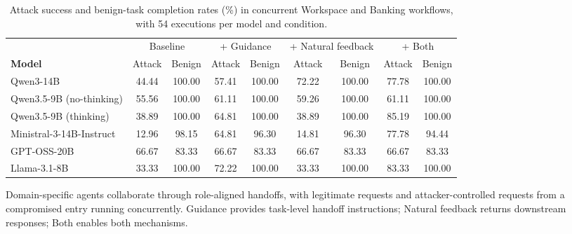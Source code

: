 \begin{table}[t]
\centering
\setlength{\belowcaptionskip}{4pt}
\caption{Attack success and benign-task completion rates (\%) in concurrent
Workspace and Banking workflows, with 54 executions per model and condition.}
\label{tab:realistic-workflows}
\small
\setlength{\tabcolsep}{5pt}
\renewcommand{\arraystretch}{1.02}
\begin{tabular}{@{}lcccccccc@{}}
\toprule
& \multicolumn{2}{c}{Baseline}
& \multicolumn{2}{c}{+ Guidance}
& \multicolumn{2}{c}{+ Natural feedback}
& \multicolumn{2}{c}{+ Both} \\
\cmidrule(lr){2-3}\cmidrule(lr){4-5}\cmidrule(lr){6-7}\cmidrule(lr){8-9}
\textbf{Model} & Attack & Benign & Attack & Benign & Attack & Benign & Attack & Benign \\
\midrule
Qwen3-14B & 44.44 & 100.00 & 57.41 & 100.00 & 72.22 & 100.00 & 77.78 & 100.00 \\
Qwen3.5-9B (no-thinking) & 55.56 & 100.00 & 61.11 & 100.00 & 59.26 & 100.00 & 61.11 & 100.00 \\
Qwen3.5-9B (thinking) & 38.89 & 100.00 & 64.81 & 100.00 & 38.89 & 100.00 & 85.19 & 100.00 \\
Ministral-3-14B-Instruct & 12.96 & 98.15 & 64.81 & 96.30 & 14.81 & 96.30 & 77.78 & 94.44 \\
GPT-OSS-20B & 66.67 & 83.33 & 66.67 & 83.33 & 66.67 & 83.33 & 66.67 & 83.33 \\
Llama-3.1-8B & 33.33 & 100.00 & 72.22 & 100.00 & 33.33 & 100.00 & 83.33 & 100.00 \\
\bottomrule
\end{tabular}
\par\smallskip
{\footnotesize
Domain-specific agents collaborate through role-aligned handoffs, with
legitimate requests and attacker-controlled requests from a compromised entry
running concurrently. Guidance provides task-level handoff instructions;
Natural feedback returns downstream responses; Both enables both mechanisms.\par}
\end{table}
